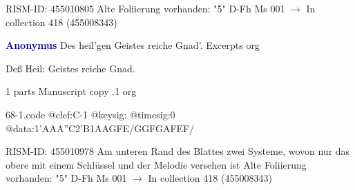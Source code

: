 \documentclass[twocolumn]{book}
\begin{document}
\newline RISM-ID: 455010805
\newline Alte Foliierung vorhanden: "5"
\newline D-Fh  Ms 001
\newline $\rightarrow$ In collection 418 (455008343)

\newline \par \vspace{7pt} \textcolor{darkblue}{\textbf{Anonymus  }}
\newline Des heil'gen Geistes reiche Gnad'. Excerpts    
\newline org
\newline \begin{itshape} Deß Heil: Geistes reiche Gnad.\end{itshape} 
\newline \textcolor{darkblue}{}  1 parts  
\newline Manuscript copy
.1  org  
\begin{filecontents*}{68-1.code}
@clef:C-1
@keysig:
@timesig:0
@data:1'AAA''C2'B1AAGFE/GGFGAFEF/
\end{filecontents*}
\newline
%

\newline RISM-ID: 455010978
\newline Am unteren Rand des Blattes zwei Systeme, wovon nur das obere mit einem Schlüssel und der Melodie versehen ist
\newline Alte Foliierung vorhanden: "5"
\newline D-Fh  Ms 001
\newline $\rightarrow$ In collection 418 (455008343)
\end{document}
